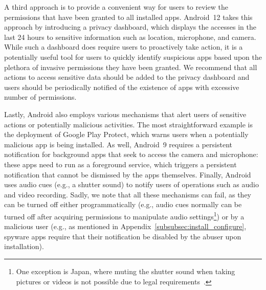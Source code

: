 \documentclass[sigconf,balance=false]{acmart}
\newcommand{\alex}[1]{\textcolor{chicagomaroon}{\noindent[AL: #1]}}
\newcommand{\geoff}[1]{\textcolor{purple}{\noindent[GV: #1]}}
\newcommand{\alex}[1]{}
\newcommand{\geoff}[1]{}
\begin{document}
A third approach is to provide a convenient way for users to review the
permissions that have been granted to all installed apps.  Android~12 takes this
approach by introducing a privacy dashboard, which displays the
accesses in the last 24 hours to sensitive information such as location, microphone, and camera.
While such a dashboard does require users to proactively
take action, it is a potentially useful tool for users to quickly identify
suspicious apps based upon the plethora of invasive permissions they have been
granted. We
recommend that all actions to access sensitive data should be added to the
privacy dashboard and users should be periodically notified of the existence of apps with excessive number of permissions.

Lastly, Android also employs various mechanisms that alert users of sensitive actions or potentially malicious activities. 
The most straightforward example is the deployment of Google Play Protect, which warns users when a potentially malicious app is being installed. As well, Android~9 requires a persistent notification for background apps that seek to access the camera and microphone: these apps need to run as a foreground service, which triggers a persistent notification that cannot be dismissed by the apps themselves. Finally, Android uses audio cues (e.g., a shutter sound) to notify users of operations such as audio and video recording. Sadly, we note that all these mechanisms can fail, as they can be turned off either programmatically (e.g., audio cues normally can be
turned off after acquiring permissions to manipulate audio
settings\footnote{One exception is Japan, where muting the shutter sound when
taking pictures or videos is not possible due to legal
requirements~\cite{HowcanIt38:online}.}) or by a malicious user (e.g., as mentioned in Appendix~\ref{subsubsec:install_configure}, spyware apps require that their notification be disabled by the abuser upon installation).
\end{document}
